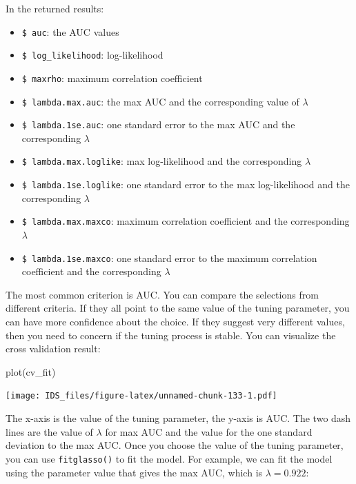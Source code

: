 \documentclass[
  12pt,
]{krantz}
\makeatletter
\newenvironment{Shaded}{\begin{snugshade}}{\end{snugshade}}
\newcommand{\FunctionTok}[1]{\textcolor[rgb]{0,0,0}{#1}}
\newcommand{\NormalTok}[1]{#1}
\providecommand{\tightlist}{%
  \setlength{\itemsep}{0pt}\setlength{\parskip}{0pt}}
\newenvironment{kframe}{%
\medskip{}
\setlength{\fboxsep}{.8em}
 \def\at@end@of@kframe{}%
 \ifinner\ifhmode%
  \def\at@end@of@kframe{\end{minipage}}%
  \begin{minipage}{\columnwidth}%
 \fi\fi%
 \def\FrameCommand##1{\hskip\@totalleftmargin \hskip-\fboxsep
 \colorbox{shadecolor}{##1}\hskip-\fboxsep
     \hskip-\linewidth \hskip-\@totalleftmargin \hskip\columnwidth}%
 \MakeFramed {\advance\hsize-\width
   \@totalleftmargin\z@ \linewidth\hsize
   \@setminipage}}%
 {\par\unskip\endMakeFramed%
 \at@end@of@kframe}
\renewenvironment{Shaded}{\begin{kframe}}{\end{kframe}}
\makeatother
\begin{document}
In the returned results:

\begin{itemize}
\tightlist
\item
  \texttt{\$\ auc}: the AUC values
\item
  \texttt{\$\ log\_likelihood}: log-likelihood
\item
  \texttt{\$\ maxrho}: maximum correlation coefficient
\item
  \texttt{\$\ lambda.max.auc}: the max AUC and the corresponding value of \(\lambda\)
\item
  \texttt{\$\ lambda.1se.auc}: one standard error to the max AUC and the corresponding \(\lambda\)
\item
  \texttt{\$\ lambda.max.loglike}: max log-likelihood and the corresponding \(\lambda\)
\item
  \texttt{\$\ lambda.1se.loglike}: one standard error to the max log-likelihood and the corresponding \(\lambda\)
\item
  \texttt{\$\ lambda.max.maxco}: maximum correlation coefficient and the corresponding \(\lambda\)
\item
  \texttt{\$\ lambda.1se.maxco}: one standard error to the maximum correlation coefficient and the corresponding \(\lambda\)
\end{itemize}

The most common criterion is AUC. You can compare the selections from different criteria. If they all point to the same value of the tuning parameter, you can have more confidence about the choice. If they suggest very different values, then you need to concern if the tuning process is stable. You can visualize the cross validation result:

\begin{Shaded}
\begin{Highlighting}[]
\FunctionTok{plot}\NormalTok{(cv\_fit)}
\end{Highlighting}
\end{Shaded}

\texttt{[image: IDS\_files/figure-latex/unnamed-chunk-133-1.pdf]}

The x-axis is the value of the tuning parameter, the y-axis is AUC. The two dash lines are the value of \(\lambda\) for max AUC and the value for the one standard deviation to the max AUC. Once you choose the value of the tuning parameter, you can use \texttt{fitglasso()} to fit the model. For example, we can fit the model using the parameter value that gives the max AUC, which is \(\lambda=0.922\):
\end{document}
